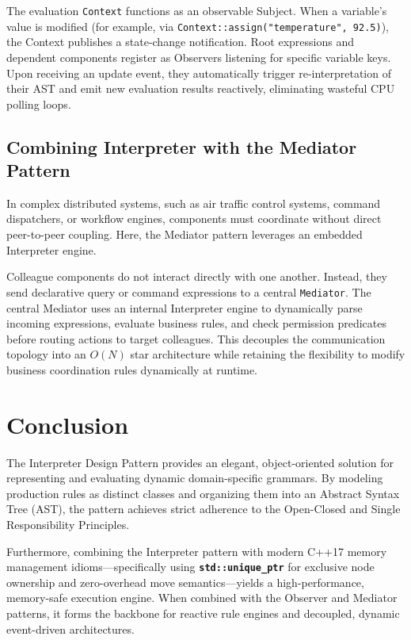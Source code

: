 \documentclass[12pt,a4paper]{article}
\begin{document}
The evaluation \texttt{Context} functions as an observable Subject. When a variable's value is modified (for example, via \texttt{Context::assign("temperature", 92.5)}), the Context publishes a state-change notification. Root expressions and dependent components register as Observers listening for specific variable keys. Upon receiving an update event, they automatically trigger re-interpretation of their AST and emit new evaluation results reactively, eliminating wasteful CPU polling loops.

\subsection{Combining Interpreter with the Mediator Pattern}
In complex distributed systems, such as air traffic control systems, command dispatchers, or workflow engines, components must coordinate without direct peer-to-peer coupling. Here, the Mediator pattern leverages an embedded Interpreter engine.

Colleague components do not interact directly with one another. Instead, they send declarative query or command expressions to a central \texttt{Mediator}. The central Mediator uses an internal Interpreter engine to dynamically parse incoming expressions, evaluate business rules, and check permission predicates before routing actions to target colleagues. This decouples the communication topology into an $O(N)$ star architecture while retaining the flexibility to modify business coordination rules dynamically at runtime.

\section{Conclusion}
The Interpreter Design Pattern provides an elegant, object-oriented solution for representing and evaluating dynamic domain-specific grammars. By modeling production rules as distinct classes and organizing them into an Abstract Syntax Tree (AST), the pattern achieves strict adherence to the Open-Closed and Single Responsibility Principles. 

Furthermore, combining the Interpreter pattern with modern C++17 memory management idioms—specifically using \textbf{\texttt{std::unique\_ptr}} for exclusive node ownership and zero-overhead move semantics—yields a high-performance, memory-safe execution engine. When combined with the Observer and Mediator patterns, it forms the backbone for reactive rule engines and decoupled, dynamic event-driven architectures.
\end{document}
